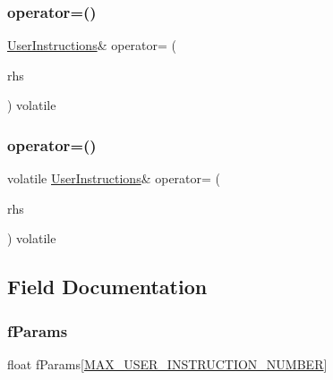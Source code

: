 \subsubsection{\texorpdfstring{operator=()}{operator=()}\hspace{0.1cm}{\footnotesize\ttfamily [1/2]}}
{\footnotesize\ttfamily \mbox{\hyperlink{struct_user_instructions}{User\+Instructions}}\& operator= (\begin{DoxyParamCaption}\item[{const volatile \mbox{\hyperlink{struct_user_instructions}{User\+Instructions}} \&}]{rhs }\end{DoxyParamCaption}) volatile\hspace{0.3cm}{\ttfamily [inline]}}

\mbox{\label{struct_user_instructions_a70e5ef4407c43d8e574dfe4b46083d56}} 
\subsubsection{\texorpdfstring{operator=()}{operator=()}\hspace{0.1cm}{\footnotesize\ttfamily [2/2]}}
{\footnotesize\ttfamily volatile \mbox{\hyperlink{struct_user_instructions}{User\+Instructions}}\& operator= (\begin{DoxyParamCaption}\item[{const \mbox{\hyperlink{struct_user_instructions}{User\+Instructions}} \&}]{rhs }\end{DoxyParamCaption}) volatile\hspace{0.3cm}{\ttfamily [inline]}}



\subsection{Field Documentation}
\mbox{\label{struct_user_instructions_a2f3be588265c4ed198e1687433e53754}} 
\subsubsection{\texorpdfstring{fParams}{fParams}}
{\footnotesize\ttfamily float f\+Params\mbox{[}\mbox{\hyperlink{_master_8h_a495826fb50dc325303ad65b8a2e2ca8a}{M\+A\+X\+\_\+\+U\+S\+E\+R\+\_\+\+I\+N\+S\+T\+R\+U\+C\+T\+I\+O\+N\+\_\+\+N\+U\+M\+B\+ER}}\mbox{]}}

